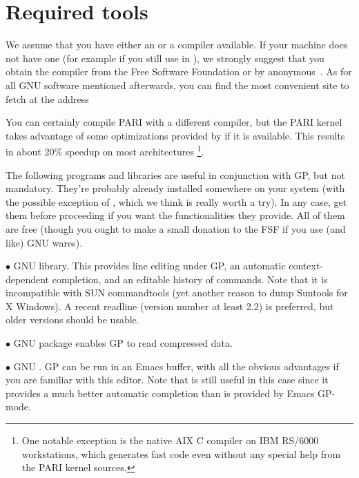 %
%

\def\tocwrite#1{}
\section{Required tools}

We assume that you have either an  or a  compiler
available. If your machine does not have one (for example if you still use
 in ), we strongly suggest that you obtain the
 compiler from the Free Software Foundation or by
anonymous~. As for all GNU software mentioned afterwards, you can
find the most convenient site to fetch  at the address


\noindent
You can certainly compile PARI with a different compiler, but the PARI
kernel takes advantage of some optimizations provided by  if it is
available. This results in about 20\% speedup on most architectures%
\footnote*{One notable exception is the native AIX C compiler on IBM
RS/6000 workstations, which generates fast code even without any special
help from the PARI kernel sources.}.

 The following programs and libraries are useful
in conjunction with GP, but not mandatory. They're probably already installed
somewhere on your system (with the possible exception of ,
which we think is really worth a try). In any case, get them before
proceeding if you want the functionalities they provide. All of them are free
(though you ought to make a small donation to the FSF if you use (and like)
GNU wares).

  $\bullet$ GNU  library. This provides line editing under GP,
an automatic context-dependent completion, and an editable history of
commands. Note that it is incompatible with SUN commandtools (yet another
reason to dump Suntools for X Windows). A recent readline (version number at
least 2.2) is preferred, but older versions should be usable.

  $\bullet$ GNU  package enables GP to read
compressed data.

  $\bullet$ GNU . GP can be run in an Emacs buffer, with all the
obvious advantages if you are familiar with this editor. Note that
 is still useful in this case since it provides a much better
automatic completion than is provided by Emacs GP-mode.

